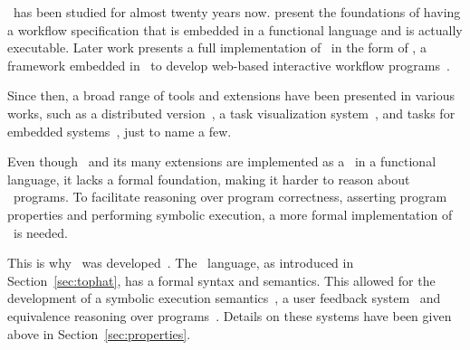 \TOP\ has been studied for almost twenty years now.
\citet{conf/icfp/PlasmeijerAK07} present the foundations of having a workflow specification that is embedded in a functional language and is actually executable.
Later work presents a full implementation of \TOP\ in the form of \ITASKS, a framework embedded in \CLEAN\ to develop web-based interactive workflow programs~\cite{conf/ppdp/PlasmeijerLMAK12}.

Since then, a broad range of tools and extensions have been presented in various works, such as a distributed version~\cite{conf/ifl/OortgieseGAP17}, a task visualization system~\cite{conf/sfp/StutterheimPA14,conf/cefp/StutterheimAP15}, and tasks for embedded systems~\cite{conf/cgo/KoopmanLP18,conf/ifl/LubbersKP18,conf/mipro/LubbersKP19,conf/ifl/LubbersKP19}, just to name a few.

Even though \ITASKS\ and its many extensions are implemented as a \DSL\ in a functional language, it lacks a formal foundation, making it harder to reason about \TOP\ programs.
To facilitate reasoning over program correctness, asserting program properties and performing symbolic execution, a more formal implementation of \TOP\ is needed.

This is why \TOPHAT\ was developed~\cite{conf/ppdp/SteenvoordenNK19}.
The \TOPHAT\ language, as introduced in Section~\ref{sec:tophat}, has a formal syntax and semantics.
This allowed for the development of a symbolic execution semantics~\cite{conf/ifl/NausSK19}, a user feedback system~\cite{conf/sfp/NausS20} and equivalence reasoning over programs~\cite{conf/sfp/KlijnsmaS22}.
Details on these systems have been given above in Section~\ref{sec:properties}.